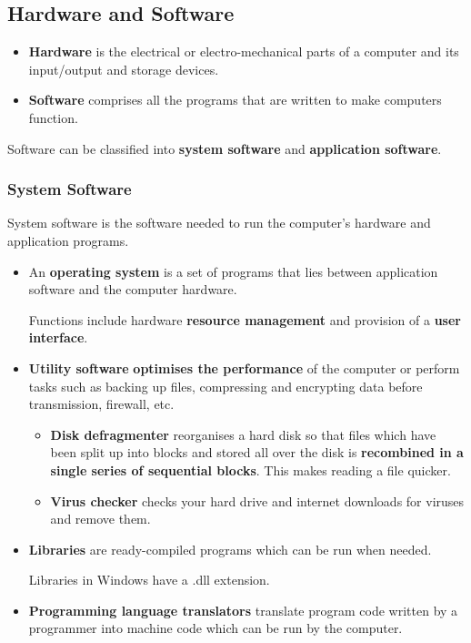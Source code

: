 \subsection{Hardware and Software}

\begin{itemize}
    \item \textbf{Hardware} is the electrical or electro-mechanical parts of a computer and its input/output and storage devices.
    \item \textbf{Software} comprises all the programs that are written to make computers function.
\end{itemize}

Software can be classified into \textbf{system software} and \textbf{application software}.

\subsubsection*{System Software}

System software is the software needed to run the computer's hardware and application programs.
\begin{itemize}
    \item An \textbf{operating system} is a set of programs that lies between application software and the computer hardware.

        Functions include hardware \textbf{resource management} and provision of a \textbf{user interface}.

    \item \textbf{Utility software} \textbf{optimises the performance} of the computer or perform tasks such as backing up files, compressing and encrypting data before transmission, firewall, etc.

        \begin{itemize}
            \item \textbf{Disk defragmenter} reorganises a hard disk so that files which have been split up into blocks and stored all over the disk is \textbf{recombined in a single series of sequential blocks}. This makes reading a file quicker.
            \item \textbf{Virus checker} checks your hard drive and internet downloads for viruses and remove them.
        \end{itemize}

    \item \textbf{Libraries} are ready-compiled programs which can be run when needed.

        Libraries in Windows have a .dll extension.
        
    \item \textbf{Programming language translators} translate program code written by a programmer into machine code which can be run by the computer.
\end{itemize}

